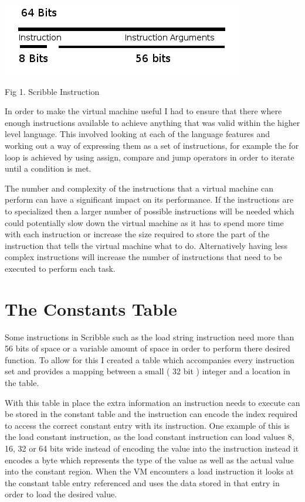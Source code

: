 \documentclass[]{final_report}
\begin{document}
\includegraphics{"Instruction"}

Fig 1. Scribble Instruction

In order to make the virtual machine useful I had to ensure that there where enough instructions available to achieve anything that was valid within the higher level language. This involved looking at each of the language features and working out a way of expressing them as a set of instructions, for example the for loop is achieved by using assign, compare and jump operators in order to iterate until a condition is met. 

The number and complexity of the instructions that a virtual machine can perform can have a significant impact on its performance. If the instructions are to specialized then a larger number of possible instructions will be needed which could potentially slow down the virtual machine as it has to spend more time with each instruction or increase the size required to store the part of the instruction that tells the virtual machine what to do. Alternatively having less complex instructions will increase the number of instructions that need to be executed to perform each task.

\section{The Constants Table}

Some instructions in Scribble such as the load string instruction need more than 56 bits of space or a variable amount of space in order to perform there desired function. To allow for this I created a table which accompanies every instruction set and provides a mapping between a small ( 32 bit ) integer and a location in the table.

With this table in place the extra information an instruction needs to execute can be stored in the constant table and the instruction can encode the index required to access the correct constant entry with its instruction. One example of this is the load constant instruction, as the load constant instruction can load values 8, 16, 32 or 64 bits wide instead of encoding the value into the instruction instead it encodes a byte which represents the type of the value as well as the actual value into the constant region. When the VM encounters a load instruction it looks at the constant table entry referenced and uses the data stored in that entry in order to load the desired value.
\end{document}
